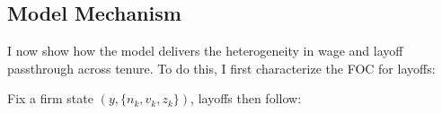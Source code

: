 \subsection{Model Mechanism}
I now show how the model delivers the heterogeneity in wage and layoff passthrough across tenure. 
To do this, I first characterize the FOC for layoffs:
\begin{proposition} \label{prop:layoffs}
  Fix a firm state $(y,\{n_k,v_k,z_k\})$, layoffs then follow:
  \[\]
\end{proposition}




